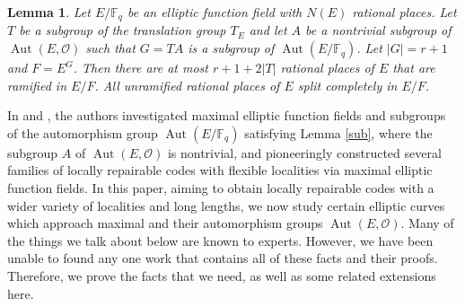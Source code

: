 \documentclass[journal,12pt,onecolumn]{IEEEtran}
\newtheorem{lemma}{Lemma}
\begin{document}
\begin{lemma}\label{split_place}
    Let \( E/\mathbb{F}_q \) be an elliptic function field with \( N(E) \) rational places. Let \( T \) be a subgroup of the translation group \( T_E \) and let \( A \) be a nontrivial subgroup of \( \operatorname{Aut}(E, \mathcal{O}) \) such that \( G = TA \) is a subgroup of \( \operatorname{Aut}(E/\mathbb{F}_q) \). Let \( |G| = r + 1 \) and \( F = E^G \). Then there are at most \( r + 1 + 2|T| \) rational places of \( E \) that are ramified in \( E/F \). All unramified rational places of \( E \) split completely in \( E/F \).
\end{lemma}

In \cite{Optimal_Locally_Repairable_Codes_Via_Elliptic_Curves} and \cite{MA2023105686}, the authors investigated maximal elliptic function fields and subgroups of the automorphism group $\operatorname{Aut}(E / \mathbb{F}_q)$ satisfying Lemma \ref{sub}, where the subgroup \(A\) of \( \operatorname{Aut}(E, \mathcal{O}) \) is nontrivial, and pioneeringly constructed several families of locally repairable codes with flexible localities via maximal elliptic function fields. In this paper, aiming to obtain locally repairable codes with a wider variety of localities and long lengths, we now study certain elliptic curves which approach maximal and their automorphism groups \( \operatorname{Aut}(E, \mathcal{O}) \). Many of the things we talk about below are known to experts. However, we have been unable to found any one work that contains all of these facts and their proofs. Therefore, we prove the facts that we need, as well as some related extensions here. 
\end{document}

